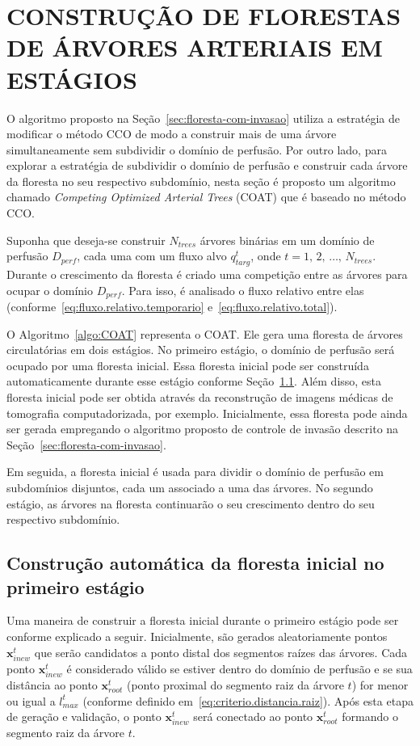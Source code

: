 \section{CONSTRUÇÃO DE FLORESTAS DE ÁRVORES ARTERIAIS EM ESTÁGIOS} \label{sec:coat}

O algoritmo proposto na Seção~\ref{sec:floresta-com-invasao} utiliza a estratégia de 
modificar o método CCO de modo a construir mais de uma árvore simultaneamente 
sem subdividir o domínio de perfusão. Por outro lado, para explorar a estratégia de 
subdividir o domínio de perfusão e construir cada árvore da floresta no seu respectivo
subdomínio, nesta seção é proposto um algoritmo chamado \textit{Competing Optimized Arterial Trees} 
(COAT) que é baseado no método CCO.

Suponha que deseja-se construir $N_{trees}$ árvores binárias em um domínio de perfusão $D_{perf}$, 
cada uma com um fluxo alvo $q_{targ}^t$, onde $t = 1,\,2,\,\ldots,\,N_{trees}$.
Durante o crescimento da floresta é criado uma competição entre as 
árvores para ocupar o domínio $D_{perf}$. Para isso, é analisado o fluxo relativo entre elas
(conforme~\eqref{eq:fluxo.relativo.temporario} e~\eqref{eq:fluxo.relativo.total}).

O Algoritmo~\ref{algo:COAT} representa o COAT. Ele 
gera uma floresta de árvores circulatórias em dois estágios. 
No primeiro estágio, o domínio de perfusão será ocupado por 
uma floresta inicial. 
Essa floresta inicial pode ser construída automaticamente durante esse estágio 
conforme Seção~\ref{subsec:construcao-floresta-inicial}. Além disso, esta floresta inicial 
pode ser obtida através da reconstrução de imagens médicas de tomografia 
computadorizada, por exemplo. Inicialmente, essa floresta pode ainda ser gerada 
empregando o algoritmo proposto de controle de invasão descrito na Seção~\ref{sec:floresta-com-invasao}.

Em seguida, a floresta 
inicial é usada para dividir o domínio de perfusão em subdomínios 
disjuntos, cada um associado a uma das árvores.
No segundo estágio, as árvores na floresta continuarão 
o seu crescimento dentro do seu respectivo subdomínio.

\subsection{Construção automática da floresta inicial no primeiro estágio}\label{subsec:construcao-floresta-inicial}

Uma maneira de construir a floresta inicial durante o primeiro estágio pode 
ser conforme explicado a seguir. Inicialmente, são gerados aleatoriamente 
pontos $\mathbf{x}_{inew}^t$ que serão candidatos a ponto distal 
dos segmentos raízes das árvores. Cada ponto $\mathbf{x}_{inew}^t$ é 
considerado válido se estiver dentro do domínio de perfusão e se sua distância ao 
ponto $\mathbf{x}_{root}^t$ (ponto proximal do segmento raiz da árvore $t$) for 
menor ou igual a $l_{max}^t$ (conforme definido em~\eqref{eq:criterio.distancia.raiz}).
Após esta etapa de geração e validação, 
o ponto $\mathbf{x}_{inew}^t$ será conectado ao ponto $\mathbf{x}_{root}^t$ formando
o segmento raiz da árvore $t$.

